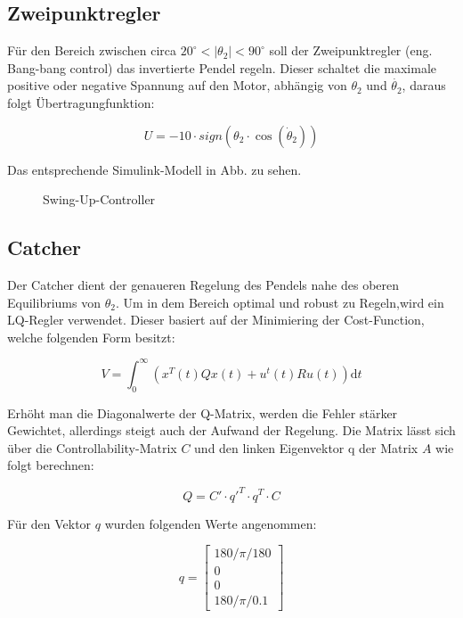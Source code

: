 \subsection{Zweipunktregler}
\label{zweipunktregler} 

Für den Bereich zwischen circa $20^\circ < \left| \theta_2 \right| < 90^\circ$ soll der Zweipunktregler (eng. Bang-bang control) das invertierte Pendel regeln. Dieser schaltet die maximale positive oder negative Spannung auf den Motor, abhängig von $ \theta_2 $ und $ \dot{\theta_2} $, daraus folgt  Übertragungfunktion:

\begin{equation}
U = -10 \cdot sign(\theta_2 \cdot \cos(\dot{\theta}_2))
\end{equation}

  Das entsprechende Simulink-Modell in Abb. %
zu sehen. 

\begin{figure}[h!]
  \caption{Swing-Up-Controller}
  \centering
\end{figure}

\subsection{Catcher}
\label{catcher} 

Der Catcher dient der genaueren Regelung des Pendels nahe des oberen Equilibriums von $ \theta_2 $. Um in dem Bereich optimal und robust zu Regeln,wird ein LQ-Regler verwendet. Dieser basiert auf der Minimiering der Cost-Function, welche folgenden Form besitzt:

\begin{equation}
 V = \int_0^\infty \! (x^T(t) Qx(t) + u^t(t) R u(t))  \mathrm{d}t
\end{equation}

Erhöht man die Diagonalwerte der Q-Matrix, werden die Fehler stärker Gewichtet, allerdings steigt auch der Aufwand der Regelung. Die Matrix lässt sich über die Controllability-Matrix $C$ und den linken Eigenvektor q der Matrix $A$
wie folgt berechnen:

\begin{equation}
 Q = C' \cdot q'^T \cdot q^T \cdot C
\end{equation}

Für den Vektor $q$ wurden folgenden Werte angenommen:

\begin{equation}
q =\begin{bmatrix}
         180/\pi/180 \\
         0\\
         0\\
         180/\pi/0.1
        \end{bmatrix}
\end{equation}
 
